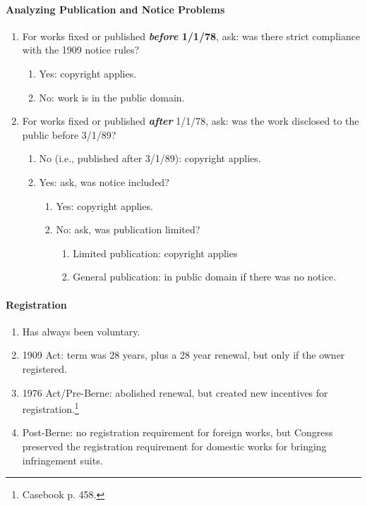 \paragraph{Analyzing Publication and Notice Problems}

\begin{enumerate}
    \item For works fixed or published \textbf{\emph{before} 1/1/78}, ask: was 
    there strict compliance with the 1909 notice rules?
    \begin{enumerate}
        \item Yes: copyright applies.
        \item No: work is in the public domain.
    \end{enumerate}
    \item For works fixed or published \textbf{\emph{after}} 1/1/78, ask: was 
    the work disclosed to the public before 3/1/89?
    \begin{enumerate}
        \item No (i.e., published after 3/1/89): copyright applies.
        \item Yes: ask, was notice included?
        \begin{enumerate}
            \item Yes: copyright applies.
            \item No: ask, was publication limited?
            \begin{enumerate}
                \item Limited publication: copyright applies
                \item General publication: in public domain if there was no 
                notice. 
            \end{enumerate}
        \end{enumerate}
    \end{enumerate}
\end{enumerate}

\paragraph{Registration}

\begin{enumerate}
    \item Has always been voluntary.
    \item 1909 Act: term was 28 years, plus a 28 year renewal, but only if the 
    owner registered.
    \item 1976 Act/Pre-Berne: abolished renewal, but created new incentives 
    for registration.\footnote{Casebook p. 458.}
    \item Post-Berne: no registration requirement for foreign works, but 
    Congress preserved the registration requirement for domestic works for 
    bringing infringement suits.
\end{enumerate}

